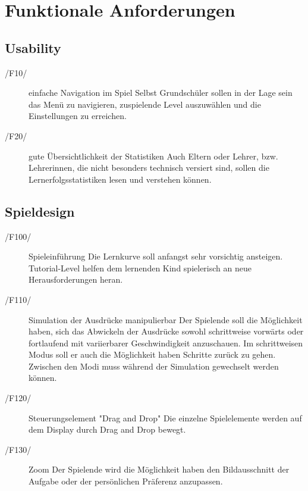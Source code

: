 \section{Funktionale Anforderungen}

\subsection{Usability}

\begin{description}
	\item[/F10/] einfache Navigation im Spiel \label{F10} \newline
	Selbst Grundschüler sollen in der Lage sein das Menü zu navigieren, zuspielende Level auszuwählen und die Einstellungen zu erreichen.
	\item[/F20/] gute Übersichtlichkeit der Statistiken \label{F10} \newline
	Auch  Eltern oder Lehrer, bzw. Lehrerinnen, die nicht besonders technisch versiert sind, sollen die Lernerfolgsstatistiken lesen und verstehen können.
\end{description}

\subsection{Spieldesign}

\begin{description}
	\item[/F100/] Spieleinführung \label{F100} \newline
	Die Lernkurve soll anfangst sehr vorsichtig ansteigen. Tutorial-Level helfen dem lernenden Kind spielerisch an neue Herausforderungen heran.
	\item[/F110/] Simulation der Ausdrücke manipulierbar\label{F110} \newline
	Der Spielende soll die Möglichkeit haben, sich das Abwickeln der Ausdrücke sowohl schrittweise vorwärts oder fortlaufend mit variierbarer Geschwindigkeit anzuschauen. Im schrittweisen Modus soll er auch die Möglichkeit haben Schritte zurück zu gehen. Zwischen den Modi muss während der Simulation gewechselt werden können.
	\item[/F120/] Steuerungselement "Drag and Drop"\label{F120} \newline
	Die einzelne Spielelemente werden auf dem Display durch Drag and Drop bewegt.
	\item[/F130/] Zoom\label{F130} \newline
	Der Spielende wird die Möglichkeit haben den Bildausschnitt der Aufgabe oder der persönlichen Präferenz anzupassen.	

\end{description}


